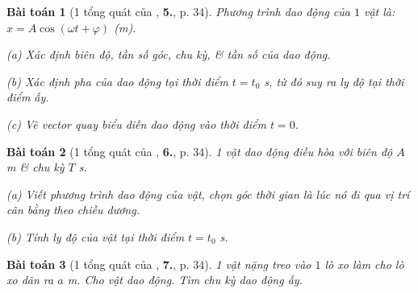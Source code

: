 \documentclass{article}
\numberwithin{equation}{section}
\newtheorem{baitoan}{Bài toán}[section]
\begin{document}
\begin{baitoan}[1 tổng quát của \cite{SGK_Vat_Ly_12_nang_cao}, \textbf{5.}, p. 34]
	Phương trình dao động của $1$ vật là: $x = A\cos(\omega t + \varphi)$ (m).
	\begin{enumerate*}
		\item[(a)] Xác định biên độ, tần số góc, chu kỳ, \& tần số của dao động.
		\item[(b)] Xác định pha của dao động tại thời điểm $t = t_0$ s, từ đó suy ra ly độ tại thời điểm ấy.
		\item[(c)] Vẽ vector quay biểu diễn dao động vào thời điểm $t = 0$.
	\end{enumerate*}
\end{baitoan}

\begin{baitoan}[1 tổng quát của \cite{SGK_Vat_Ly_12_nang_cao}, \textbf{6.}, p. 34]
	1 vật dao động điều hòa với biên độ $A$ m \& chu kỳ $T$ s.
	\begin{enumerate*}
		\item[(a)] Viết phương trình dao động của vật, chọn góc thời gian là lúc nó đi qua vị trí cân bằng theo chiều dương.
		\item[(b)] Tính ly độ của vật tại thời điểm $t = t_0$ s.
	\end{enumerate*}
\end{baitoan}

\begin{baitoan}[1 tổng quát của \cite{SGK_Vat_Ly_12_nang_cao}, \textbf{7.}, p. 34]
	1 vật nặng treo vào $1$ lò xo làm cho lò xo dãn ra $a$ m. Cho vật dao động. Tìm chu kỳ dao động ấy.
\end{baitoan}
\end{document}
